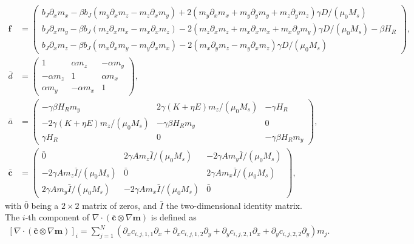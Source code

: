 \begin{subequations}
\begin{align}
\mathbold{f} &= 
 \begin{pmatrix}
  b_J\partial_x m_x - \beta b_J(m_y\partial_xm_z - m_z\partial_xm_y) + 2(m_y\partial_xm_x+m_y\partial_ym_y+m_z\partial_ym_z)\gamma D/(\mu_0M_s)\\
  b_J\partial_x m_y - \beta b_J(m_z\partial_xm_x-m_x\partial_xm_z)-2(m_z\partial_xm_z+m_x\partial_xm_x+m_x\partial_ym_y) \gamma D/(\mu_0M_s) -\beta H_R\\
  b_J\partial_xm_z - \beta b_J(m_x\partial_xm_y-m_y\partial_xm_x) - 2(m_x\partial_ym_z-m_y\partial_xm_z)\gamma D/(\mu_0M_s)
 \end{pmatrix}, \\
\bar{d} &= 
 \begin{pmatrix}
  1 & \alpha m_z & -\alpha m_y \\
  -\alpha m_z & 1 & \alpha m_x \\
  \alpha m_y & -\alpha m_x  & 1
 \end{pmatrix}, \\
 \bar{a} &= 
 \begin{pmatrix}
  -\gamma \beta H_R m_y & 2\gamma (K+\eta E) m_z/(\mu_0M_s) & -\gamma H_R \\
  -2\gamma (K+\eta E) m_z/(\mu_0M_s) & -\gamma\beta H_R m_y & 0 \\
  \gamma H_R & 0  & -\gamma \beta H_R m_y
 \end{pmatrix}, \\
  \mathbold{\bar{c}} &= 
 \begin{pmatrix}
  \bar{0} & 2\gamma Am_z\bar{I}/(\mu_0M_s) & -2\gamma Am_y\bar{I}/(\mu_0M_s) \\
  -2\gamma Am_z\bar{I}/(\mu_0M_s)  & \bar{0} & 2\gamma Am_x\bar{I}/(\mu_0M_s) \\
  2\gamma Am_y\bar{I}/(\mu_0M_s) & -2\gamma Am_x\bar{I}/(\mu_0M_s)  & \bar{0}
 \end{pmatrix},
\end{align}
\end{subequations}
with $\bar{0}$ being a $2\times 2$ matrix of zeros, and $\bar{I}$ the two-dimensional identity matrix. The $i$-th component of $\nabla\cdot(\mathbold{\bar{c}}\otimes\nabla \mathbold{m})$ is defined as
\begin{align}
    \left[\nabla\cdot(\mathbold{\bar{c}}\otimes\nabla \mathbold{m})\right]_i = \sum_{j=1}^{N}\left(\partial_xc_{i,j,1,1}\partial_x+\partial_xc_{i,j,1,2}\partial_y+\partial_yc_{i,j,2,1}\partial_x+\partial_yc_{i,j,2,2}\partial_y\right) m_j.
\end{align}
